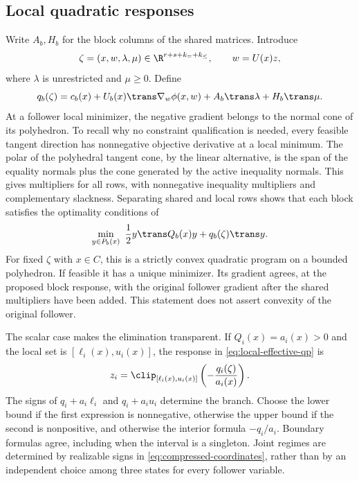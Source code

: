 \subsection{Local quadratic responses}\label{subsec:local-elimination}

Write $A_b,H_b$ for the block columns of the shared matrices. Introduce
\begin{equation}\label{eq:compressed-coordinates}
 \zeta=(x,w,\lambda,\mu)\in
 \R^{r+s+k_=+k_{\le}},\qquad w=U(x)z,
\end{equation}
where $\lambda$ is unrestricted and $\mu\ge0$. Define
\begin{equation}\label{eq:effective-linear-cost}
 q_b(\zeta)=c_b(x)+U_b(x)\trans\nabla_w\phi(x,w)
                         +A_b\trans\lambda+H_b\trans\mu.
\end{equation}
At a follower local minimizer, the negative gradient belongs to the
normal cone of its polyhedron. To recall why no constraint qualification
is needed, every feasible tangent direction has nonnegative objective
derivative at a local minimum. The polar of the polyhedral tangent cone,
by the linear alternative, is the span of the equality normals plus the
cone generated by the active inequality normals. This gives multipliers
for all rows, with nonnegative inequality multipliers and complementary
slackness. Separating shared and local rows shows that each block satisfies
the optimality conditions of
\begin{equation}\label{eq:local-effective-qp}
 \min_{y\in P_b(x)}\ \frac12 y\trans Q_b(x)y+q_b(\zeta)\trans y.
\end{equation}
For fixed $\zeta$ with $x\in C$, this is a strictly convex quadratic
program on a bounded polyhedron. If feasible it has a unique minimizer.
Its gradient agrees, at the proposed block response, with the original
follower gradient after the shared multipliers have been added. This
statement does not assert convexity of the original follower.

The scalar case makes the elimination transparent. If $Q_i(x)=a_i(x)>0$
and the local set is $[\ell_i(x),u_i(x)]$, the response in
\eqref{eq:local-effective-qp} is
\begin{equation}\label{eq:scalar-clipping}
 z_i=\clip_{[\ell_i(x),u_i(x)]}\left(-\frac{q_i(\zeta)}{a_i(x)}\right).
\end{equation}
The signs of $q_i+a_i\ell_i$ and $q_i+a_i u_i$ determine the branch.
Choose the lower bound if the first expression is nonnegative, otherwise
the upper bound if the second is nonpositive, and otherwise the interior
formula $-q_i/a_i$. Boundary formulas agree, including when the interval
is a singleton. Joint regimes are determined by realizable signs in
\eqref{eq:compressed-coordinates}, rather than by an independent choice
among three states for every follower variable.

